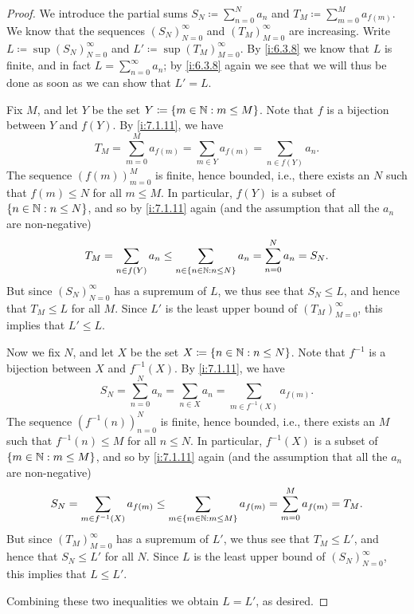 \begin{proof}
  We introduce the partial sums \(S_N \coloneqq \sum_{n = 0}^N a_n\) and \(T_M \coloneqq \sum_{m = 0}^M a_{f(m)}\).
  We know that the sequences \((S_N)_{N = 0}^\infty\) and \((T_M)_{M = 0}^\infty\) are increasing.
  Write \(L \coloneqq \sup(S_N)_{N = 0}^\infty\) and \(L' \coloneqq \sup(T_M)_{M = 0}^\infty\).
  By \cref{i:6.3.8} we know that \(L\) is finite, and in fact \(L = \sum_{n = 0}^\infty a_n\);
  by \cref{i:6.3.8} again we see that we will thus be done as soon as we can show that \(L' = L\).

  Fix \(M\), and let \(Y\) be the set \(Y \coloneqq \left\lbrace m \in \mathbb{N} : m \leq M\right\rbrace\).
  Note that \(f\) is a bijection between \(Y\) and \(f(Y)\).
  By \cref{i:7.1.11}, we have
  \[
    T_M = \sum_{m = 0}^M a_{f(m)} = \sum_{m \in Y} a_{f(m)} = \sum_{n \in f(Y)} a_n.
  \]
  The sequence \((f(m))_{m = 0}^M\) is finite, hence bounded, i.e., there exists an \(N\) such that \(f(m) \leq N\) for all \(m \leq M\).
  In particular, \(f(Y)\) is a subset of \(\left\lbrace n \in \mathbb{N} : n \leq N\right\rbrace\), and so by \cref{i:7.1.11} again (and the assumption that all the \(a_n\) are non-negative)
  \[
    T_M = \sum_{n \in f(Y)} a_n \leq \sum_{n \in \left\lbrace n \in \mathbb{N} : n \leq N\right\rbrace} a_n = \sum_{n = 0}^N a_n = S_N.
  \]
  But since \((S_N)_{N = 0}^\infty\) has a supremum of \(L\), we thus see that \(S_N \leq L\), and hence that \(T_M \leq L\) for all \(M\).
  Since \(L'\) is the least upper bound of \((T_M)_{M = 0}^\infty\), this implies that \(L' \leq L\).

  Now we fix \(N\), and let \(X\) be the set \(X \coloneqq \left\lbrace n \in \mathbb{N} : n \leq N\right\rbrace\).
  Note that \(f^{-1}\) is a bijection between \(X\) and \(f^{-1}(X)\).
  By \cref{i:7.1.11}, we have
  \[
    S_N = \sum_{n = 0}^N a_n = \sum_{n \in X} a_n = \sum_{m \in f^{-1}(X)} a_{f(m)}.
  \]
  The sequence \((f^{-1}(n))_{n = 0}^N\) is finite, hence bounded, i.e., there exists an \(M\) such that \(f^{-1}(n) \leq M\) for all \(n \leq N\).
  In particular, \(f^{-1}(X)\) is a subset of \(\left\lbrace m \in \mathbb{N} : m \leq M\right\rbrace\), and so by \cref{i:7.1.11} again (and the assumption that all the \(a_n\) are non-negative)
  \[
    S_N = \sum_{m \in f^{-1}(X)} a_{f(m)} \leq \sum_{m \in \left\lbrace m \in \mathbb{N} : m \leq M\right\rbrace} a_{f(m)} = \sum_{m = 0}^M a_{f(m)} = T_M.
  \]
  But since \((T_M)_{M = 0}^\infty\) has a supremum of \(L'\), we thus see that \(T_M \leq L'\), and hence that \(S_N \leq L'\) for all \(N\).
  Since \(L\) is the least upper bound of \((S_N)_{N = 0}^\infty\), this implies that \(L \leq L'\).

  Combining these two inequalities we obtain \(L = L'\), as desired.
\end{proof}

